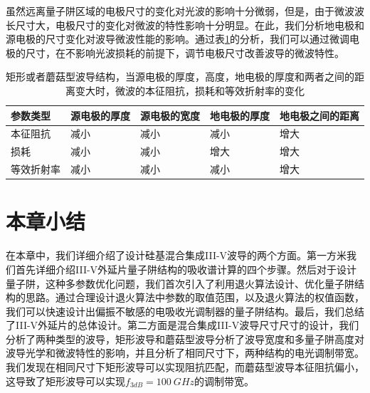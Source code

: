 虽然远离量子阱区域的电极尺寸的变化对光波的影响十分微弱，但是，由于微波波长尺寸大，电极尺寸的变化对微波的特性影响十分明显。在此，我们分析地电极和源电极的尺寸变化对波导微波性能的影响。通过表\ref{rect_metal_influence}的分析，我们可以通过微调电极的尺寸，在不影响光波损耗的前提下，调节电极尺寸改善波导的微波特性。	
{
	\begin{table}[htb]
		\caption{矩形或者蘑菇型波导结构，当源电极的厚度，高度，地电极的厚度和两者之间的距离变大时，微波的本征阻抗，损耗和等效折射率的变化}
		\label{rect_metal_influence}
		\centering
		\begin{tabular}[t]{lllll}
			\hline
			参数类型 &源电极的厚度 & 源电极的宽度 & 地电极的厚度& 地电极之间的距离 \\
			\hline
			本征阻抗 &   减小 & 减小 & 减小 &增大\\
			损耗  &   减小 & 减小 & 增大 &增大\\
			等效折射率 &  减小 & 减小 & 减小 &增大\\
			\hline
		\end{tabular}
	\end{table}
}

			
\section{本章小结}
在本章中，我们详细介绍了设计硅基混合集成III-V波导的两个方面。第一方米我们首先详细介绍III-V外延片量子阱结构的吸收谱计算的四个步骤。然后对于设计量子阱，这种多参数优化问题，我们首次引入了利用退火算法设计、优化量子阱结构的思路。通过合理设计退火算法中参数的取值范围，以及退火算法的权值函数，我们可以快速设计出偏振不敏感的电吸收光调制器的量子阱结构。最后，我们总结了III-V外延片的总体设计。第二方面是混合集成III-V波导尺寸尺寸的设计，我们分析了两种类型的波导，矩形波导和蘑菇型波导分析了波导宽度和多量子阱高度对波导光学和微波特性的影响，并且分析了相同尺寸下，两种结构的电光调制带宽。我们发现在相同尺寸下矩形波导可以实现阻抗匹配，而蘑菇型波导本征阻抗偏小，这导致了矩形波导可以实现$f_{3dB} = 100~GHz$的调制带宽。